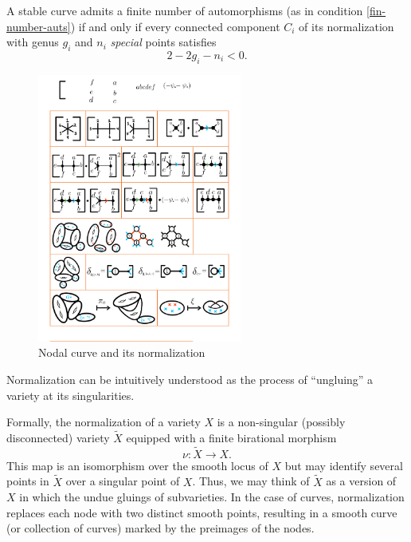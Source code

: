 \documentclass[12pt]{memoir}
\begin{document}
\begin{Th}\label{th-stability-condition-22gn}
A stable curve admits a finite number of automorphisms (as in condition \ref{fin-number-auts}) if and only if every connected component $C_i$ of its normalization with genus $g_i$ and $n_i$ \emph{special} points satisfies 
$$2-2g_i-n_i<0.$$
\end{Th}

\begin{Rmk} %
\begin{figure}[h!]
        \centering
        \includegraphics[width=0.6\textwidth, trim= 1.32cm 9.5cm 12.7cm 15.4cm,clip]{../figs/FigsDNnotability1.pdf}
        \caption{Nodal curve and its normalization}
        \label{fig:normalization-example}
    \end{figure}
Normalization can be intuitively understood as the process of ``ungluing'' a variety at its singularities.\par
Formally, the normalization of a variety $X$ is a non-singular (possibly disconnected) variety $\widetilde X$ equipped with a finite birational morphism 
$$\nu:\widetilde X\to X.$$
This map is an isomorphism over the smooth locus of $X$ but may identify several points in $\widetilde X$ over a singular point of $X$. Thus, we may think of $\widetilde X$ as a version of $X$ in which the undue gluings of subvarieties. In the case of curves, normalization replaces each node with two distinct smooth points, resulting in a smooth curve (or collection of curves) marked by the preimages of the nodes. 
\end{Rmk}
\end{document}
